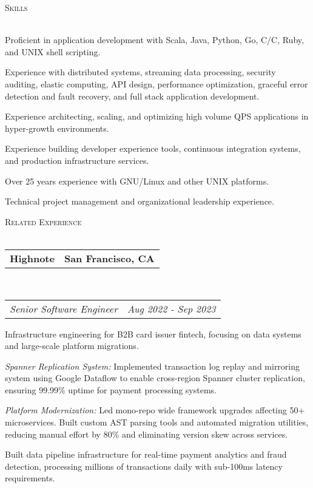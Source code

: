 \documentclass[12pt,letterpaper]{article}
\makeatletter
\newcommand{\area}[2]{\emph{#1:}   #2}
\newcommand{\lineunder}{\vspace*{-8pt} \\ \hspace*{-18pt} \hrulefill \\}
\newcommand{\header}[1]{{\hspace*{-15pt}\vspace*{6pt} \textsc{#1}} \vspace*{-6pt} \lineunder}
\newcommand{\headerrow}[2]
{\begin{tabular*}{\linewidth}{l@{\extracolsep{\fill}}r}
	#1 &
	#2 \\
\end{tabular*}}
\newcommand{\CPP}
{C\nolinebreak[4]\hspace{-.05em}\raisebox{.22ex}{\footnotesize\bf ++}}
\newcommand{\employment}[5]{
	\headerrow
		{\textbf{#1}}
		{\textbf{#2}}
	\\
	\headerrow
		{\emph{#3}}
		{\emph{#4}}
	\begin{itemize*}
		\item #5
	\end{itemize*}
}
\makeatother
\begin{document}
\vspace*{3pt}

\header{Skills}
\vspace*{-5pt}
\begin{itemize*}
\item Proficient in application development with Scala, Java, Python, Go, C/\CPP, Ruby, and UNIX shell scripting. 
\item Experience with distributed systems, streaming data processing, security auditing, elastic
  computing, API design, performance optimization, graceful error detection and
  fault recovery, and full stack application development.
\item Experience architecting, scaling, and optimizing high volume QPS applications in hyper-growth environments.
\item Experience building developer experience tools, continuous integration
  systems, and production infrastructure services.
\item Over 25 years experience with GNU/Linux and other UNIX platforms.
\item Technical project management and organizational leadership experience.
\end{itemize*}
\vspace*{3pt}

\header{Related Experience}
\employment{Highnote}{San Francisco, CA}{Senior Software Engineer}{Aug 2022 - Sep 2023}{
Infrastructure engineering for B2B card issuer fintech, focusing on data systems and large-scale platform migrations.
\item \area{Spanner Replication System}{Implemented transaction log replay and mirroring system using Google Dataflow to enable cross-region Spanner cluster replication, ensuring 99.99\% uptime for payment processing systems.}
\item \area{Platform Modernization}{Led mono-repo wide framework upgrades affecting 50+ microservices. Built custom AST parsing tools and automated migration utilities, reducing manual effort by 80\% and eliminating version skew across services.}
\item Built data pipeline infrastructure for real-time payment analytics and fraud detection, processing millions of transactions daily with sub-100ms latency requirements.
}
\end{document}
